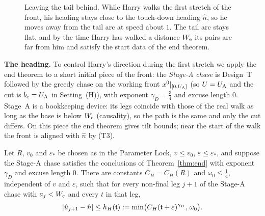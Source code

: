 \begin{figure}[!htbp]
\centering
{}
\caption{Leaving the tail behind. While Harry walks the first stretch of the front, his heading stays close to the
touch-down heading $\hat n$, so he moves away from the tail arc at speed about $1$. The tail arc stays flat, and by
the time Harry has walked a distance $W_{\mathrm{e}}$ its pairs are far from him and satisfy the start data of the end theorem.}
\label{fig:departure}
\end{figure}

\textbf{The heading.} To control Harry's direction during the first stretch we apply the end theorem to a short initial
piece of the front: the \emph{Stage-A chase} is Design~T followed by the greedy chase on the working front
$x^0|_{[0,U_{\mathrm{A}}]}$ (so $U=U_{\mathrm{A}}$ and the cut is $b_c=U_{\mathrm{A}}$ in Setting~(H)), with exponent $\gamma_D=\frac34$ and excuse
length $0$. Stage~A is a bookkeeping device: its legs coincide with those of the real walk as long as the base is below
$W_{\mathrm{e}}$ (causality), so the path is the same and only the cut differs. On this piece the end theorem gives tilt bounds;
near the start of the walk the front is aligned with $\hat n$ by (T3).

\begin{lemma}\label{lem:heading}
Let $R$, $v_0$ and $\varepsilon_*$ be chosen as in the Parameter Lock, $v\le v_0$, $\varepsilon\le\varepsilon_*$, and
suppose the Stage-A chase satisfies the conclusions of Theorem~\ref{thm:end} with exponent $\gamma_D$ and excuse length
$0$. There are constants $C_H=C_H(R)$ and $\omega_0\le\frac14$, independent of $v$ and $\varepsilon$, such that for every
non-final leg $j+1$ of the Stage-A chase with $a_j<W_{\mathrm{e}}$ and every $t$ in that leg,
\[
|\hat u_{j+1}-\hat n|\le h_H(\mathfrak{t}):=\min\bigl(C_H(\mathfrak{t}+\varepsilon)^{\gamma_D},\,\omega_0\bigr).
\]
\end{lemma}

